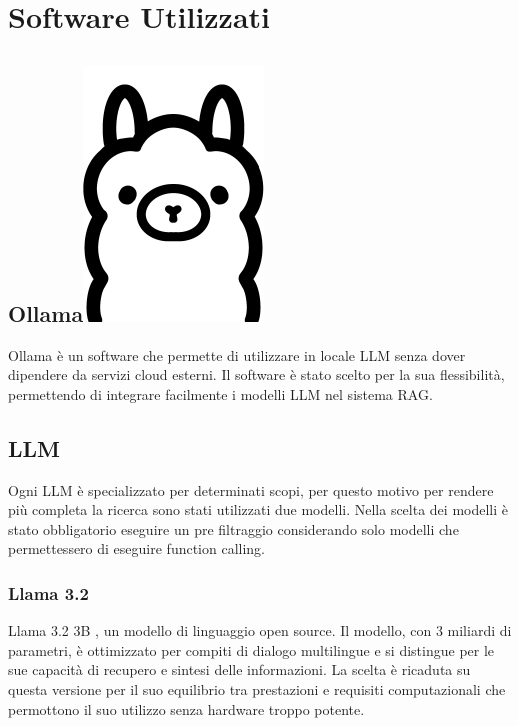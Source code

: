\documentclass[12pt,a4paper,openright,twoside]{book}
\begin{document}
\section{Software Utilizzati}
\subsection{Ollama\hspace{0.3cm}\protect\includegraphics[width=0.03\linewidth]{figures/ollama.png}}
Ollama \cite{ollama-docs} è un software che permette di utilizzare in locale LLM
senza dover dipendere da servizi cloud esterni.
Il software è stato scelto per la sua flessibilità, permettendo di integrare facilmente i modelli LLM nel sistema RAG.
\subsection{LLM}
Ogni LLM è specializzato per determinati scopi,
per questo motivo per rendere più completa la ricerca sono stati utilizzati due modelli.
Nella scelta dei modelli è stato obbligatorio eseguire un pre filtraggio considerando solo modelli che permettessero di eseguire function calling.

\subsubsection{Llama 3.2}
Llama 3.2 3B \cite{llama3-2}, un modello di linguaggio open source.
Il modello, con 3 miliardi di parametri, è ottimizzato per compiti di dialogo multilingue e si distingue per le sue capacità di recupero e sintesi delle informazioni.
La scelta è ricaduta su questa versione per il suo equilibrio tra prestazioni e requisiti computazionali che permottono il suo utilizzo senza hardware troppo potente.
\end{document}
